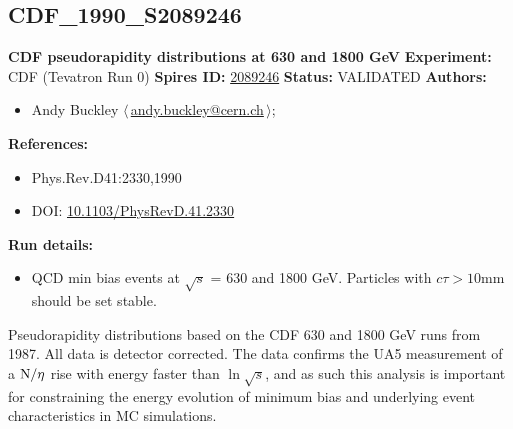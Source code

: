 \subsection[CDF\_1990\_S2089246]{CDF\_1990\_S2089246\,\cite{Abe:1989td}}
\textbf{CDF pseudorapidity distributions at 630 and 1800 GeV}\newline
\textbf{Experiment:} CDF (Tevatron Run 0) \newline
\textbf{Spires ID:} \href{http://www.slac.stanford.edu/spires/find/hep/www?rawcmd=key+2089246}{2089246}\newline
\textbf{Status:} VALIDATED\newline
\textbf{Authors:}
\begin{itemize}
  \item Andy Buckley $\langle\,$\href{mailto:andy.buckley@cern.ch}{andy.buckley@cern.ch}$\,\rangle$;
\end{itemize}
\textbf{References:}
\begin{itemize}
  \item Phys.Rev.D41:2330,1990
  \item DOI: \href{http://dx.doi.org/10.1103/PhysRevD.41.2330}{10.1103/PhysRevD.41.2330}
\end{itemize}
\textbf{Run details:}
\begin{itemize}

  \item QCD min bias events at \ensuremath{\sqrt{s}} = 630 and 1800 GeV. Particles with $c \tau > 10$mm should be set stable.\end{itemize}

\noindent Pseudorapidity distributions based on the CDF 630 and 1800 GeV runs from 1987. All data is detector corrected. The data confirms the UA5 measurement of a $\d{N}/\d{\eta}$ rise with energy faster than $\ln{\sqrt{s}}$, and as such this analysis is important for constraining the energy evolution of minimum bias and underlying event characteristics in MC simulations.

\clearpage


\clearpage

